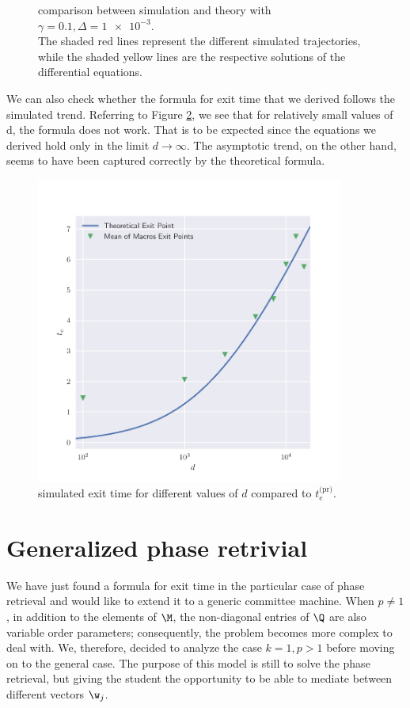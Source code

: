 \begin{figure}
  \caption{
    comparison between simulation and theory with \(\gamma=\num{0.1}, \Delta=\num{1e-3}\).\\
    The shaded red lines represent the different simulated trajectories,
    while the shaded yellow lines are the respective solutions of the differential equations.
  }
  \label{fig:spherical-phase-retrivial-d10000}
\end{figure}
We can also check whether the formula for exit time that we derived follows the simulated trend.
Referring to Figure \ref{fig:spherical-phase-retrivial-with-d}, we see that for relatively small values of d, the formula does not work.
That is to be expected since the equations we derived hold only in the limit \(d\to\infty\).
The asymptotic trend, on the other hand, seems to have been captured correctly by the theoretical formula.
\begin{figure}
  \centering
  \includegraphics[width=0.9\textwidth]{figures/spherical/phase-retrivial-dplot.pdf}
  \caption{
    simulated exit time for different values of \(d\) compared to \(t^\text{(pr)}_e\).
  }
  \label{fig:spherical-phase-retrivial-with-d}
\end{figure}

\section{Generalized phase retrivial}
We have just found a formula for exit time in the particular case of phase retrieval and would like to extend it to a generic committee machine.
When \(p\neq1\), in addition to the elements of \(\M\), the non-diagonal entries of \(\Q\) are also variable order parameters;
consequently, the problem becomes more complex to deal with.
We, therefore, decided to analyze the case \(k=1,p>1\) before moving on to the general case.
The purpose of this model is still to solve the phase retrieval,
but giving the student the opportunity to be able to mediate between different vectors \(\w_j\).

